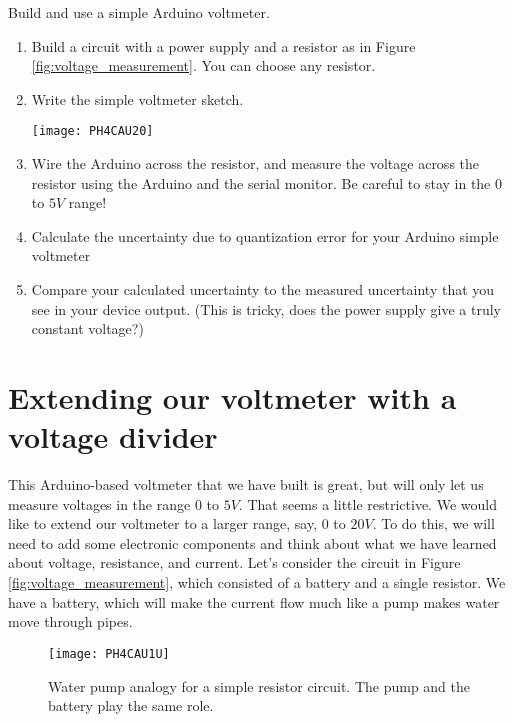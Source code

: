 \activity
{
Build and use a simple Arduino voltmeter.
\begin{enumerate}
\item Build a circuit with a power supply and a resistor as in 
	Figure \ref{fig:voltage_measurement}. You can choose any resistor. 

\item Write the simple voltmeter sketch.

\begin{center}
\texttt{[image: PH4CAU20]}
\end{center}
\item Wire the Arduino across the resistor, and measure the voltage 
	across the resistor using the Arduino and the serial monitor. 
	Be careful to stay in the $0$ to $5 \unit{V}$ range!

\item Calculate the uncertainty due to quantization error for your Arduino
simple voltmeter

\item Compare your calculated uncertainty to the measured uncertainty that
you see in your device output. (This is tricky, does the power supply give a
truly constant voltage?)
\end{enumerate}

}

\section{Extending our voltmeter with a voltage divider\label{Voltmeter with
Voltage Divider}}

This Arduino-based voltmeter that we have built is great, but will only let
us measure voltages in the range $0$ to $5\unit{V}.$ That seems a little
restrictive. We would like to extend our voltmeter to a larger range, say, $%
0 $ to $20\unit{V}.$ To do this, we will need to add some electronic
components and think about what we have learned about voltage, resistance,
and current. Let's consider the circuit in Figure \ref{fig:voltage_measurement},
which consisted of a battery and a single resistor.
We have a battery, which will make
the current flow much like a pump makes water move through pipes.

\begin{figure}[htbp!]
\centering
\texttt{[image: PH4CAU1U]}
	\caption[Water pump analogy for a simple resistor circuit]{Water pump
	analogy for a simple resistor circuit. The pump and the battery play 
	the same role.}
	\label{fig:water_pump_analogy_1}
\end{figure}

